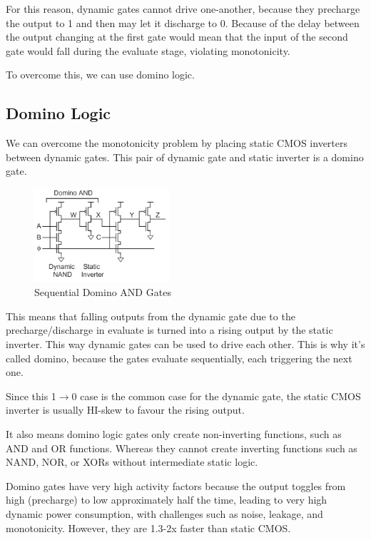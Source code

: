 \documentclass{article}
\begin{document}
For this reason, dynamic gates cannot drive one-another, because they precharge the output to 1 and then may let it discharge to 0. Because of the delay between the output changing at the first gate would mean that the input of the second gate would fall during the evaluate stage, violating monotonicity. 

To overcome this, we can use domino logic. 

\subsection{Domino Logic}

We can overcome the monotonicity problem by placing static CMOS inverters between dynamic gates. This pair of dynamic gate and static inverter is a domino gate.


\begin{figure}[ht!]
\centering
\includegraphics[width=50mm]{domino.png}
\caption{Sequential Domino AND Gates}
\end{figure}



 This means that falling outputs from the dynamic gate due to the precharge/discharge in evaluate is turned into a rising output by the static inverter. This way dynamic gates can be used to drive each other. This is why it's called domino, because the gates evaluate sequentially, each triggering the next one.
 
 Since this 1$\rightarrow$0 case is the common case for the dynamic gate, the static CMOS inverter is usually HI-skew to favour the rising output.
 
 It also means domino logic gates only create non-inverting functions, such as AND and OR functions. Whereas they cannot create inverting functions such as NAND, NOR, or XORs without intermediate static logic.  
 
 Domino gates have very high activity factors because the output toggles from high (precharge) to low approximately half the time, leading to very high dynamic power consumption, with challenges such as noise, leakage, and monotonicity. However, they are 1.3-2x faster than static CMOS. 
 
\end{document}
